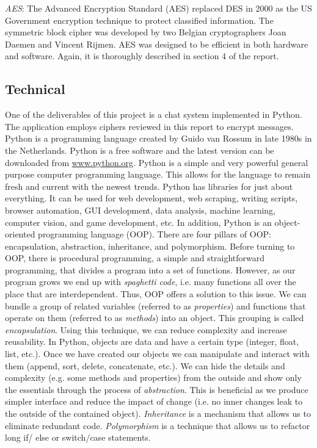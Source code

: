\textit{AES}: The Advanced Encryption Standard (AES) replaced DES in 2000 as the US Government encryption technique to protect classified information. The symmetric block cipher was developed by two Belgian cryptographers Joan Daemen and Vincent Rijmen. AES was designed to be efficient in both hardware and software. Again, it is thoroughly described in section 4 of the report.

\subsection{Technical}

One of the deliverables of this project is a chat system implemented in Python. The application employs ciphers reviewed in this report to encrypt messages. Python is a programming language created by Guido van Rossum in late 1980s in the Netherlands. Python is a free software and the latest version can be downloaded from \url{www.python.org}. Python is a simple and very powerful general purpose computer programming language. This allows for the language to remain fresh and current with the newest trends. Python has libraries for just about everything. It can be used for web development, web scraping, writing scripts, browser automation, GUI development, data analysis, machine learning, computer vision, and game development, etc. In addition, Python is an object-oriented programming language (OOP). There are four pillars of OOP: encapsulation, abstraction, inheritance, and polymorphism. Before turning to OOP, there is procedural programming, a simple and straightforward programming, that divides a program into a set of functions. However, as our program grows we end up with \emph{spaghetti code}, i.e. many functions all over the place that are interdependent. Thus, OOP offers a solution to this issue. We can bundle a group of related variables (referred to as \emph{properties}) and functions that operate on them (referred to as \emph{methods}) into an object. This grouping is called \emph{encapsulation}. Using this technique, we can reduce complexity and increase reusability. In Python, objects are data and have a certain type (integer, float, list, etc.). Once we have created our objects we can manipulate and interact with them (append, sort, delete, concatenate, etc.). We can hide the details and complexity (e.g. some methods and properties) from the outside and show only the essentials through the process of \emph{abstraction}. This is beneficial as we produce simpler interface and reduce the impact of change (i.e. no inner changes leak to the outside of the contained object). \emph{Inheritance} is a mechanism that allows us to eliminate redundant code. \emph{Polymorphism} is a technique that allows us to refactor long if/ else or switch/case statements. 


